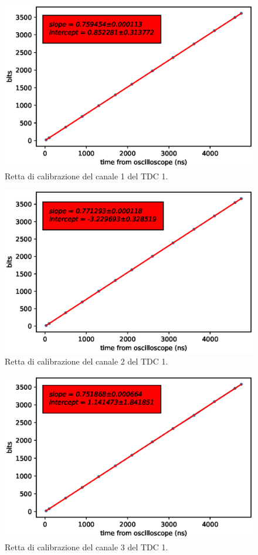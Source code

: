\begin{figure}[H]
  \centering
  \includegraphics[width=.8\textwidth]{plots/tdc11.eps}
  \caption{Retta di calibrazione del canale 1 del TDC 1.}
  \label{fig:tdc11}
\end{figure}

\begin{figure}[H]
  \centering
  \includegraphics[width=.8\textwidth]{plots/tdc12.eps}
  \caption{Retta di calibrazione del canale 2 del TDC 1.}
  \label{fig:tdc12}
\end{figure}

\begin{figure}[H]
  \centering
  \includegraphics[width=.8\textwidth]{plots/tdc13.eps}
  \caption{Retta di calibrazione del canale 3 del TDC 1.}
  \label{fig:tdc13}
\end{figure}

